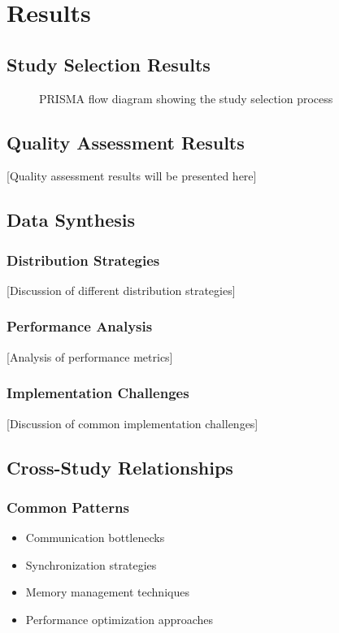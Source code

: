\section{Results}
\label{sec:results}

\subsection{Study Selection Results}
\begin{figure}[t]
    \centering
    \fbox{\rule{0pt}{2in} \rule{0.9\linewidth}{0pt}}
    \caption{PRISMA flow diagram showing the study selection process}
    \label{fig:prisma}
\end{figure}

\subsection{Quality Assessment Results}
[Quality assessment results will be presented here]

\subsection{Data Synthesis}
\subsubsection{Distribution Strategies}
[Discussion of different distribution strategies]

\subsubsection{Performance Analysis}
[Analysis of performance metrics]

\subsubsection{Implementation Challenges}
[Discussion of common implementation challenges]

\subsection{Cross-Study Relationships}
\subsubsection{Common Patterns}
\begin{itemize}
    \item Communication bottlenecks
    \item Synchronization strategies
    \item Memory management techniques
    \item Performance optimization approaches
\end{itemize}

